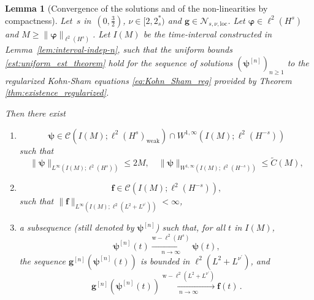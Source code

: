 \documentclass[12pt,a4paper]{amsart}
\newtheorem{lemma}[theorem]{Lemma}
\numberwithin{equation}{section}
\newcommand{\ulg}{\boldsymbol{g}}
\newcommand{\ulpsi}{\boldsymbol{\psi}}
\newcommand{\ulphi}{\boldsymbol{\varphi}}
\newcommand{\ulf}{\boldsymbol{f}}
\newcommand{\twoasts}{{2^*_s}}
\newcommand{\Nlocnu}{\mathscr{N}_{s,\nu,\mathrm{loc}}}
\begin{document}
	\begin{lemma}[Convergence of the solutions and  of the non-linearities by compactness]\label{lem:convergence-solutions}Let~$s$ in~$(0,\frac32)$, $\nu\in[2,\twoasts)$ and $\ulg\in\Nlocnu$. Let $ \ulphi  \in \ell^2(H^{s}) $ and $ M \geq \| \ulphi  \|_{\ell^2(H^{s})} $. Let $I(M)$ be the time-interval constructed in Lemma~\ref{lem:interval-indep-n}, such that the uniform bounds \eqref{est:uniform_est_theorem} hold for the sequence of solutions $(\ulpsi^{[n]})_{n \geq 1}$ to the regularized Kohn-Sham equations \eqref{eq:Kohn_Sham_reg} provided by Theorem \ref{thm:existence_regularized}.
		
		Then there exist
		\begin{enumerate}[label=\roman*)]
			\item \begin{equation}
				\ulpsi \in \mathscr{C}({I(M)}; \ell^2(H^{s})_{\mathrm{weak}}) \cap W^{1,\infty}(I(M);\ell^2(H^{-s}))
			\end{equation}
			such that
			\begin{equation}\label{est:energy_bound_solution}
				\| \ulpsi \|_{L^{\infty}(I(M); \ell^2(H^{s}))} \leq 2M , \quad \| \ulpsi \|_{W^{1,\infty}(I(M);\ell^2(H^{-s}))} \leq \tilde{C}(M),
			\end{equation}
			\item
			\begin{equation}
				\ulf \in \mathscr{C}(I(M); \ell^2(H^{-s})),
			\end{equation}
			such that $\| \ulf \|_{L^{\infty}(I(M);\ell^2(L^2+L^{\nu^\prime}))} < \infty$, 
			\item  a subsequence (still denoted by $\ulpsi^{[n]}$) such that, for all $t$ in $I(M)$,
			\begin{equation}\label{lim:weak_convergence_sequence}
				\ulpsi^{[n]}(t) \xrightarrow[n\to\infty]{\mathrm{w}-\ell^2(H^{s})} \ulpsi(t),
			\end{equation}
			the sequence $ \ulg^{[n]}(\ulpsi^{[n]}(t)) $ is bounded in $\ell^2(L^2+L^{\nu^\prime})$, and
			\begin{equation}\label{lim:weak_convergence_nonlince}
				\ulg^{[n]}(\ulpsi^{[n]}(t)) \xrightarrow[n\to\infty]{\mathrm{w}-\ell^2(L^2+L^{\nu^\prime})} \ulf(t) \,.
			\end{equation}
		\end{enumerate}
	\end{lemma}
\end{document}
